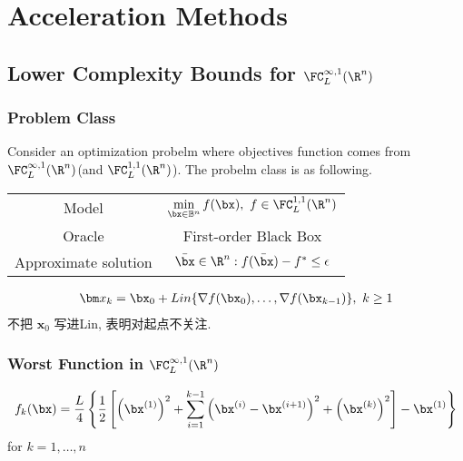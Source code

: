 \newpage
\section{Acceleration Methods}
\subsection{Lower Complexity Bounds for \texorpdfstring{$\FC_L^{\infty,1}(\R^n)$}. }

\subsubsection{Problem Class}
Consider an optimization probelm where objectives function comes from $\FC_L^{\infty, 1}(\R^n)$(and $\FC_{L}^{1,1}(\R^n)$). The probelm class is as following.
\begin{table}[!htb]
    \centering
    \begin{tabular}[c]{cc}\toprule
        Model & $\displaystyle \min_{\bx\in \mathbb{B}^n}f(\bx),\ f\in \FC_{L}^{1,1}(\R^n)$\\  \cmidrule{1-1}
        Oracle & First-order Black Box \\ \cmidrule{1-1}
        Approximate solution & $\bar{\bx}\in\R^n: f(\bar{\bx})-f^*\le \epsilon$ \\
        \bottomrule
    \end{tabular}
\end{table}


\begin{assumption}
    \begin{align*}
        \bm x_k = \bx_0 + Lin\{ \nabla f(\bx_0), \dots, \nabla f(\bx_{k-1}) \},\ k\ge 1
    \end{align*}
    不把 $\bm x_0$ 写进Lin, 表明对起点不关注. 
\end{assumption}

\subsubsection{Worst Function in \texorpdfstring{$\FC_L^{\infty,1}(\R^n)$}. }
{ \scriptsize
\begin{align*}
    f_k(\bx)=\frac{L}{4}\left\{ \frac{1}{2}\left[ \left( \bx^{(1)} \right)^2 +\sum_{i=1}^{k-1}\left( \bx^{(i)}-\bx^{(i+1)} \right)^2 + \left( \bx^{(k)} \right)^2\right] - \bx^{(1)} \right\}
\end{align*}
}
for $k=1,\dots,n$

